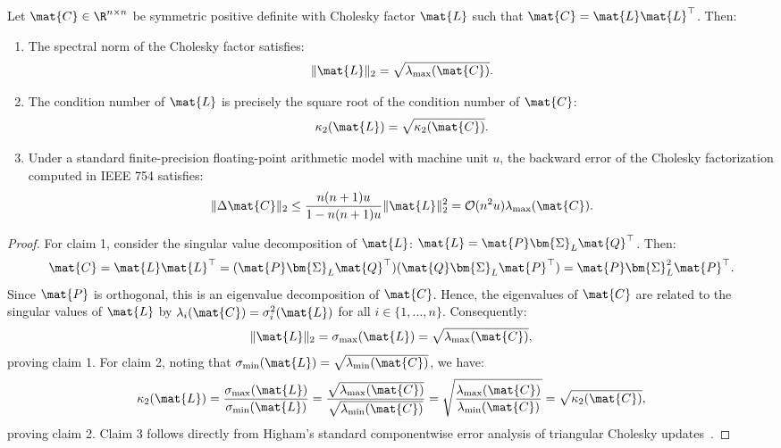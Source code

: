 \begin{lemma}
\label{lem:cholesky_conditioning}
Let $\mat{C} \in \R^{n \times n}$ be symmetric positive definite with Cholesky factor $\mat{L}$ such that $\mat{C} = \mat{L} \mat{L}^\top$. Then:
\begin{enumerate}
    \item The spectral norm of the Cholesky factor satisfies:
    \begin{equation}
    \|\mat{L}\|_2 = \sqrt{\lambda_{\max}(\mat{C})}.
    \label{eq:cholesky_norm_bound}
    \end{equation}
    \item The condition number of $\mat{L}$ is precisely the square root of the condition number of $\mat{C}$:
    \begin{equation}
    \kappa_2(\mat{L}) = \sqrt{\kappa_2(\mat{C})}.
    \label{eq:cholesky_condition_sqrt}
    \end{equation}
    \item Under a standard finite-precision floating-point arithmetic model with machine unit $u$, the backward error of the Cholesky factorization computed in IEEE 754 satisfies:
    \begin{equation}
    \|\Delta \mat{C}\|_2 \le \frac{n(n+1) u}{1 - n(n+1) u} \|\mat{L}\|_2^2 = \mathcal{O}(n^2 u) \lambda_{\max}(\mat{C}).
    \end{equation}
\end{enumerate}
\end{lemma}

\begin{proof}
For claim 1, consider the singular value decomposition of $\mat{L}$: $\mat{L} = \mat{P} \bm{\Sigma}_L \mat{Q}^\top$. Then:
\begin{equation}
\mat{C} = \mat{L} \mat{L}^\top = (\mat{P} \bm{\Sigma}_L \mat{Q}^\top)(\mat{Q} \bm{\Sigma}_L \mat{P}^\top) = \mat{P} \bm{\Sigma}_L^2 \mat{P}^\top.
\end{equation}
Since $\mat{P}$ is orthogonal, this is an eigenvalue decomposition of $\mat{C}$. Hence, the eigenvalues of $\mat{C}$ are related to the singular values of $\mat{L}$ by $\lambda_i(\mat{C}) = \sigma_i^2(\mat{L})$ for all $i \in \{1, \dots, n\}$. Consequently:
\begin{equation}
\|\mat{L}\|_2 = \sigma_{\max}(\mat{L}) = \sqrt{\lambda_{\max}(\mat{C})},
\end{equation}
proving claim 1. For claim 2, noting that $\sigma_{\min}(\mat{L}) = \sqrt{\lambda_{\min}(\mat{C})}$, we have:
\begin{equation}
\kappa_2(\mat{L}) = \frac{\sigma_{\max}(\mat{L})}{\sigma_{\min}(\mat{L})} = \frac{\sqrt{\lambda_{\max}(\mat{C})}}{\sqrt{\lambda_{\min}(\mat{C})}} = \sqrt{\frac{\lambda_{\max}(\mat{C})}{\lambda_{\min}(\mat{C})}} = \sqrt{\kappa_2(\mat{C})},
\end{equation}
proving claim 2. Claim 3 follows directly from Higham's standard componentwise error analysis of triangular Cholesky updates~\cite{golub2013matrix}.
\end{proof}

